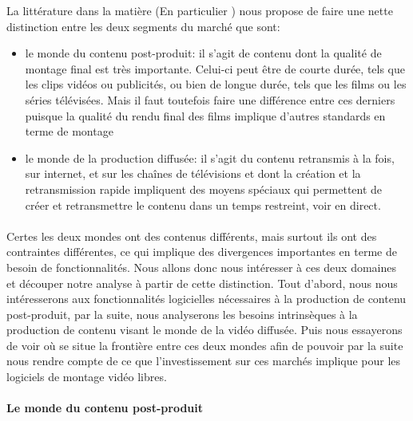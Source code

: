 La littérature dans la matière (En particulier
\cite{WorldVideoNonlinearEditingMarket}) nous propose de faire une nette
distinction entre  les deux segments du marché que sont:

\begin{itemize} \setlength{\itemsep}{2mm}

  \item {le monde du contenu post-produit: il s'agit de contenu dont la
    qualité de montage final est très importante. Celui-ci peut être de
    courte durée, tels que les clips vidéos ou publicités, ou bien de
    longue durée, tels que les films ou les séries télévisées. Mais
    il faut toutefois faire une différence entre ces derniers puisque
    la qualité du rendu final des films implique d'autres standards en
    terme de montage}

  \item {le monde de la production diffusée: il s'agit du contenu
    retransmis à la fois, sur internet, et sur les chaînes de
    télévisions et dont la création et la retransmission rapide
    impliquent des moyens spéciaux qui permettent de créer et
    retransmettre le contenu dans un temps restreint, voir en direct.}

\end{itemize}

\paragraph{}

Certes les deux mondes ont des contenus différents, mais surtout
ils ont des contraintes différentes, ce qui implique des divergences
importantes en terme de besoin de fonctionnalités. Nous allons donc
nous intéresser à ces deux domaines et découper notre analyse à
partir de cette distinction. Tout d'abord, nous nous intéresserons aux
fonctionnalités logicielles nécessaires à la production de contenu
post-produit, par la suite, nous analyserons les besoins intrinsèques
à la production de contenu visant le monde de la vidéo diffusée. Puis
nous essayerons de voir où se situe la frontière entre ces deux mondes
afin de pouvoir par la suite nous rendre compte de ce que l'investissement
sur ces marchés implique pour les logiciels de montage vidéo libres.

\paragraph{Le monde du contenu post-produit}

